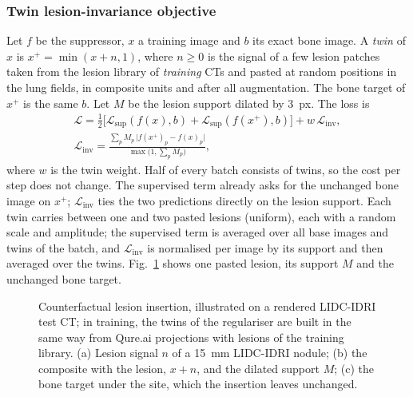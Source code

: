 \subsubsection{Twin lesion-invariance objective}
\label{sec:m-twin}
Let $f$ be the suppressor, $x$ a training image and $b$ its exact bone image. A \emph{twin} of $x$ is $x^{+}=\min(x+n,1)$, where $n\ge0$ is
the signal of a few lesion patches taken from the lesion library of \emph{training} CTs and pasted at random positions in the lung fields,
in composite units and after all augmentation. The bone target of $x^{+}$ is the same $b$. Let $M$ be the lesion support dilated by
$3$~px. The loss is
\begin{equation}
\begin{gathered}
\mathcal{L}=\tfrac12\big[\mathcal{L}_{\mathrm{sup}}(f(x),b)+\mathcal{L}_{\mathrm{sup}}(f(x^{+}),b)\big]+w\,\mathcal{L}_{\mathrm{inv}},\\
\mathcal{L}_{\mathrm{inv}}=\frac{\sum_p M_p\,\big|f(x^{+})_p-f(x)_p\big|}{\max\big(1,\sum_p M_p\big)},
\end{gathered}
\label{eq:twin}
\end{equation}
where $w$ is the twin weight. Half of every batch consists of twins, so the cost per step does not change. The supervised term already asks
for the unchanged bone image on $x^{+}$; $\mathcal{L}_{\mathrm{inv}}$ ties the two predictions directly on the lesion support. Each twin
carries between one and two pasted lesions (uniform), each with a random scale and amplitude; the supervised term is averaged over all base
images and twins of the batch, and $\mathcal{L}_{\mathrm{inv}}$ is normalised per image by its support and then averaged over the twins.
Fig.~\ref{fig:insertion} shows one pasted lesion, its support $M$ and the unchanged bone target.

\begin{figure}[!t]
\centering
{}
\caption{Counterfactual lesion insertion, illustrated on a rendered LIDC-IDRI test CT; in training, the twins of the regulariser are built
in the same way from Qure.ai projections with lesions of the training library. (a) Lesion signal $n$ of a 15~mm LIDC-IDRI nodule; (b) the
composite with the lesion, $x+n$, and the dilated support $M$; (c) the bone target under the site, which the insertion leaves unchanged.}
\label{fig:insertion}
\end{figure}

